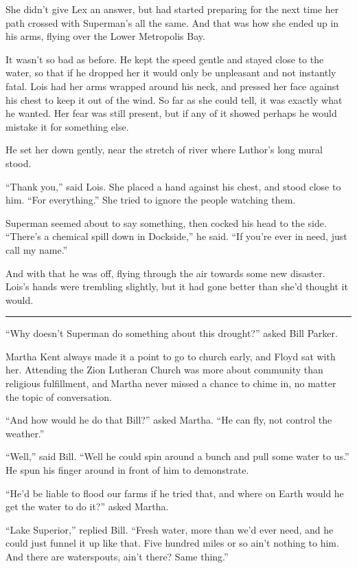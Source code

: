\documentclass[ebook,12pt]{memoir}
\begin{document}
She didn't give Lex an answer, but had started preparing for the next
time her path crossed with Superman's all the same. And that was how she
ended up in his arms, flying over the Lower Metropolis Bay.

It wasn't so bad as before. He kept the speed gentle and stayed close to
the water, so that if he dropped her it would only be unpleasant and not
instantly fatal. Lois had her arms wrapped around his neck, and pressed
her face against his chest to keep it out of the wind. So far as she
could tell, it was exactly what he wanted. Her fear was still present,
but if any of it showed perhaps he would mistake it for something else.

He set her down gently, near the stretch of river where Luthor's long
mural stood.

``Thank you,'' said Lois. She placed a hand against his chest, and stood
close to him. ``For everything.'' She tried to ignore the people
watching them.

Superman seemed about to say something, then cocked his head to the
side. ``There's a chemical spill down in Dockside,'' he said. ``If
you're ever in need, just call my name.''

And with that he was off, flying through the air towards some new
disaster. Lois's hands were trembling slightly, but it had gone better
than she'd thought it would.

\begin{center}\rule{0.5\linewidth}{\linethickness}\end{center}

``Why doesn't Superman do something about this drought?'' asked Bill
Parker.

Martha Kent always made it a point to go to church early, and Floyd sat
with her. Attending the Zion Lutheran Church was more about community
than religious fulfillment, and Martha never missed a chance to chime
in, no matter the topic of conversation.

``And how would he do that Bill?'' asked Martha. ``He can fly, not
control the weather.''

``Well,'' said Bill. ``Well he could spin around a bunch and pull some
water to us.'' He spun his finger around in front of him to demonstrate.

``He'd be liable to flood our farms if he tried that, and where on Earth
would he get the water to do it?'' asked Martha.

``Lake Superior,'' replied Bill. ``Fresh water, more than we'd ever
need, and he could just funnel it up like that. Five hundred miles or so
ain't nothing to him. And there are waterspouts, ain't there? Same
thing.''
\end{document}
